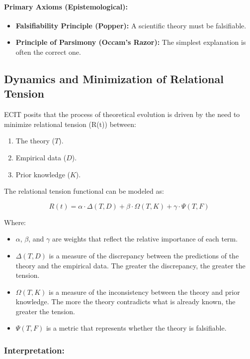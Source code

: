 \documentclass{article}
\begin{document}
\paragraph{Primary Axioms (Epistemological):}
\begin{itemize}
\item \textbf{Falsifiability Principle (Popper):} A scientific theory must be falsifiable.
\item \textbf{Principle of Parsimony (Occam's Razor):} The simplest explanation is often the correct one.
\end{itemize}


\subsection{Dynamics and Minimization of Relational Tension}

ECIT posits that the process of theoretical evolution is driven by the need to minimize relational tension (R(t)) between:

\begin{enumerate}
\item The theory (\(T\)).
\item Empirical data (\(D\)).
\item Prior knowledge (\(K\)).
\end{enumerate}

The relational tension functional can be modeled as:

$$ R(t) = \alpha \cdot \Delta(T, D) + \beta \cdot \Omega(T, K) + \gamma \cdot \Psi(T, F) $$

Where:
\begin{itemize}
    \item \(\alpha\), \(\beta\), and \(\gamma\) are weights that reflect the relative importance of each term.
    \item \(\Delta(T, D)\) is a measure of the discrepancy between the predictions of the theory and the empirical data. The greater the discrepancy, the greater the tension.
    \item \(\Omega(T, K)\) is a measure of the inconsistency between the theory and prior knowledge. The more the theory contradicts what is already known, the greater the tension.
    \item \(\Psi(T,F)\) is a metric that represents whether the theory is falsifiable.
\end{itemize}

\subsubsection{Interpretation:}
\end{document}
